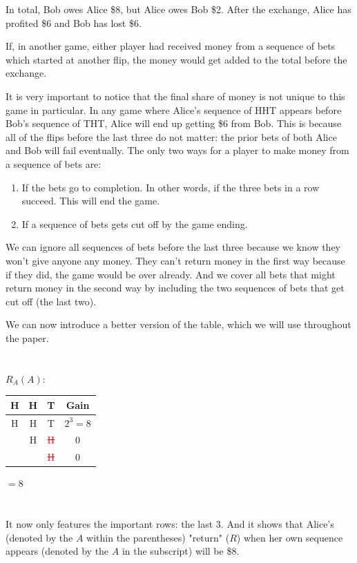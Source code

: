 \documentclass[english,12pt,a4paper,final]{article}
\begin{document}
In total, Bob owes Alice \$8, but Alice owes Bob \$2. After the exchange, Alice has profited \$6 and Bob has lost \$6.

If, in another game, either player had received money from a sequence of bets which started at another flip, the money would get added to the total before the exchange.

It is very important to notice that the final share of money is not unique to this game in particular. In any game where Alice's sequence of HHT appears before Bob's sequence of THT, Alice will end up getting \$6 from Bob. This is because all of the flips before the last three do not matter: the prior bets of both Alice and Bob will fail eventually. The only two ways for a player to make money from a sequence of bets are:

\begin{enumerate}
	\item If the bets go to completion. In other words, if the three bets in a row succeed. This will end the game.
	\item If a sequence of bets gets cut off by the game ending.
\end{enumerate}

We can ignore all sequences of bets before the last three because we know they won't give anyone any money. They can't return money in the first way because if they did, the game would be over already. And we cover all bets that might return money in the second way by including the two sequences of bets that get cut off (the last two).

We can now introduce a better version of the table, which we will use throughout the paper.
\\\\\\
$R_A(A)$:
\begin{tabular}{|ccc|c|}
	\hline
	H & H & T & Gain \\
	\hline
	
	\textcolor{OliveGreen}{H} & \textcolor{OliveGreen}{H} & \textcolor{OliveGreen}{T} & $2^3=8$ \\
	
	& \textcolor{OliveGreen}{H} & \textcolor{red}{\sout{H}} & $0$ \\
	
	&  & \textcolor{red}{\sout{H}} & $0$ \\
	\hline
\end{tabular}
$=8$
\\\\\\
It now only features the important rows: the last 3. And it shows that Alice's (denoted by the $A$ within the parentheses) "return" ($R$) when her own sequence appears (denoted by the $A$ in the subscript) will be \$8.
\end{document}
